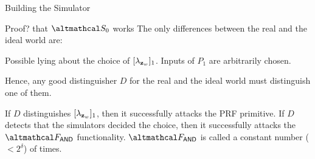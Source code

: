 \documentclass[../240906_cryptlab_flute.tex]{subfiles}
\begin{document}
\begin{frame}{Building the Simulator}
    \begin{block}{Proof? that \(\mcal{S}_0\) works}
        \pause
        The only differences between the real and the ideal world are:
        \begin{enumerate}
            \ii
            Possible lying about the choice of \([\lambda_{\mathbf{z}_w}]_1\).
            \ii
            Inputs of \(P_1\) are arbitrarily chosen.
        \end{enumerate}

        \pause
        Hence, any good distinguisher \(D\) for the real and the ideal world
        must distinguish one of them.
        \begin{enumerate}
            \ii
            If \(D\) distinguishes \([\lambda_{\mathbf{z}_w}]_1\),
            then it successfully attacks the PRF primitive.
            \ii
            If \(D\) detects that the simulators decided the choice,
            then it successfully attacks the \(\mcal{F}_\msf{AND}\) functionality.
            \(\mcal{F}_\msf{AND}\) is called a constant number (\(< 2^\delta\))
            of times.
        \end{enumerate}
    \end{block}
\end{frame}
\end{document}
